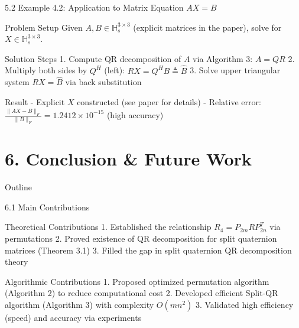 \documentclass{beamer}
\begin{document}
\begin{frame}{5.2 Example 4.2: Application to Matrix Equation $AX = B$}
  \begin{block}{Problem Setup}
    Given $A,B \in \mathbb{H}_s^{3 \times 3}$ (explicit matrices in the paper), solve for $X \in \mathbb{H}_s^{3 \times 3}$.
  \end{block}
  
  \begin{block}{Solution Steps}
    1. Compute QR decomposition of $A$ via Algorithm 3: $A = QR$
    2. Multiply both sides by $Q^H$ (left): $RX = Q^H B \triangleq \hat{B}$
    3. Solve upper triangular system $RX = \hat{B}$ via back substitution
  \end{block}
  
  \begin{block}{Result}
    - Explicit $X$ constructed (see paper for details)
    - Relative error: $\frac{\|AX - B\|_F}{\|B\|_F} = 1.2412 \times 10^{-15}$ (high accuracy)
  \end{block}
\end{frame}

\section{6. Conclusion \& Future Work}
\begin{frame}{Outline}
  \tableofcontents[sectionstyle=show/shaded, subsectionstyle=show/show/shaded]
\end{frame}

\begin{frame}{6.1 Main Contributions}
  \begin{block}{Theoretical Contributions}
    1. Established the relationship $R_4 = P_{2m} R P_{2n}^T$ via permutations
    2. Proved existence of QR decomposition for split quaternion matrices (Theorem 3.1)
    3. Filled the gap in split quaternion QR decomposition theory
  \end{block}
  
  \begin{block}{Algorithmic Contributions}
    1. Proposed optimized permutation algorithm (Algorithm 2) to reduce computational cost
    2. Developed efficient Split-QR algorithm (Algorithm 3) with complexity $O(mn^2)$
    3. Validated high efficiency (speed) and accuracy via experiments
  \end{block}
\end{frame}
\end{document}
